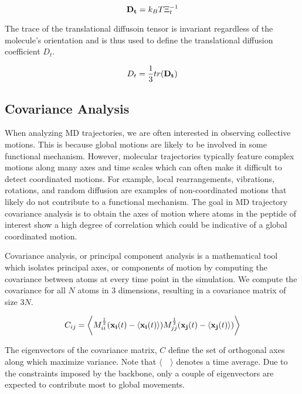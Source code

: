 \begin{equation}
\mathbf{D_{t}} = k_BT\Xi_{t}^{-1}
\end{equation}

The trace of the translational diffusoin tensor is invariant regardless of the molecule's orientation and is thus used to define the translational diffusion coefficient $D_t$.

\begin{equation}
D_t = \frac{1}{3}tr(\mathbf{D_t})
\end{equation}


\subsection{Covariance Analysis}

When analyzing MD trajectories, we are often interested in observing collective motions. This is because global motions are likely to be involved in some functional mechanism. However, molecular trajectories typically feature complex motions along many axes and time scales which can often make it difficult to detect coordinated motions. For example, local rearrangements, vibrations, rotations, and random diffusion are examples of non-coordinated motions that likely do not contribute to a functional mechanism. The goal in MD trajectory covariance analysis is to obtain the axes of motion where atoms in the peptide of interest show a high degree of correlation which could be indicative of a global coordinated motion. 

Covariance analysis, or principal component analysis is a mathematical tool which isolates principal axes, or components of motion by computing the covariance between atoms at every time point in the simulation. We compute the covariance for all $N$ atoms in $3$ dimensions, resulting in a covariance matrix of size $3N$.

\begin{equation}
C_{ij} = \bigg\langle M_{ii}^{\frac{1}{2}} (\mathbf{x_i}(t) - \langle \mathbf{x_i}(t) \rangle) M_{jj}^{\frac{1}{2}} (\mathbf{x_j}(t) - \langle \mathbf{x_j}(t) \rangle) \bigg\rangle
\end{equation}

The eigenvectors of the covariance matrix, $C$ define the set of orthogonal axes along which maximize variance. Note that $\langle \quad \rangle$ denotes a time average. Due to the constraints imposed by the backbone, only a couple of eigenvectors are expected to contribute most to global movements.

